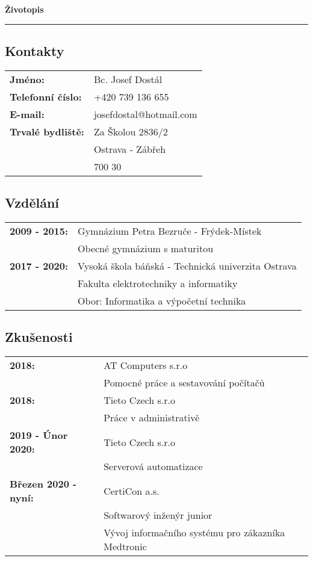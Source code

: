 \documentclass[a4paper]{article}
\begin{document}
\begin{center}
    \huge{\textbf{Životopis}}
    \par\noindent\rule{\textwidth}{0.4pt}
\end{center}

\subsection*{Kontakty}
\begin{tabular}{>{\bfseries}l l}
    Jméno: & Bc. Josef Dostál \\
    Telefonní číslo: & +420 739 136 655 \\
    E-mail: & josefdostal@hotmail.com \\
    Trvalé bydliště: & Za Školou 2836/2 \\
                     & Ostrava - Zábřeh \\
                     & 700 30
\end{tabular}

\subsection*{Vzdělání}
\begin{tabular}{>{\bfseries}l l}
    2009 - 2015: & Gymnázium Petra Bezruče - Frýdek-Místek \\
                 & Obecné gymnázium s maturitou \\
    2017 - 2020: & Vysoká škola báňská - Technická univerzita Ostrava \\
                 & Fakulta elektrotechniky a informatiky \\
                 & Obor: Informatika a výpočetní technika \\
\end{tabular}

\subsection*{Zkušenosti}
\begin{tabular}{>{\bfseries}l l}
    2018: & AT Computers s.r.o \\
          & Pomocné práce a sestavování počítačů \\
    2018: & Tieto Czech s.r.o \\
          & Práce v administrativě \\
    2019 - Únor 2020: & Tieto Czech s.r.o \\
                 & Serverová automatizace \\
    Březen 2020 - nyní: & CertiCon a.s. \\
                 & Softwarový inženýr junior  \\
                 & Vývoj informačního systému pro zákazníka Medtronic
\end{tabular}
\end{document}
